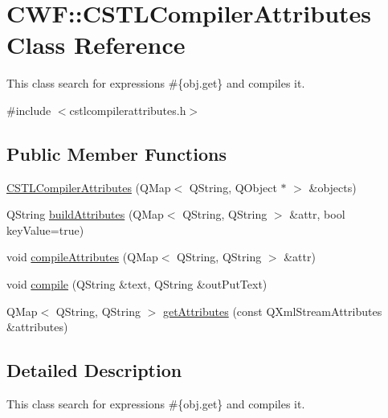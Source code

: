 \hypertarget{class_c_w_f_1_1_c_s_t_l_compiler_attributes}{\section{C\+W\+F\+:\+:C\+S\+T\+L\+Compiler\+Attributes Class Reference}
\label{class_c_w_f_1_1_c_s_t_l_compiler_attributes}
}


This class search for expressions \#\{obj.\+get\} and compiles it.  




{\ttfamily \#include $<$cstlcompilerattributes.\+h$>$}

\subsection*{Public Member Functions}
\begin{DoxyCompactItemize}
\item 
\hyperlink{class_c_w_f_1_1_c_s_t_l_compiler_attributes_a666a7c7dec101d1313027c1037255446}{C\+S\+T\+L\+Compiler\+Attributes} (Q\+Map$<$ Q\+String, Q\+Object $\ast$ $>$ \&objects)
\item 
Q\+String \hyperlink{class_c_w_f_1_1_c_s_t_l_compiler_attributes_a6c09d18bbc92ae092db120385a7d40de}{build\+Attributes} (Q\+Map$<$ Q\+String, Q\+String $>$ \&attr, bool key\+Value=true)
\item 
void \hyperlink{class_c_w_f_1_1_c_s_t_l_compiler_attributes_a5eccb899f04af2c269845f1e86e07813}{compile\+Attributes} (Q\+Map$<$ Q\+String, Q\+String $>$ \&attr)
\item 
void \hyperlink{class_c_w_f_1_1_c_s_t_l_compiler_attributes_a482a81daba4f114b75445ac54868d572}{compile} (Q\+String \&text, Q\+String \&out\+Put\+Text)
\item 
Q\+Map$<$ Q\+String, Q\+String $>$ \hyperlink{class_c_w_f_1_1_c_s_t_l_compiler_attributes_a4cbbe112e36b86ef01401e1b62804d57}{get\+Attributes} (const Q\+Xml\+Stream\+Attributes \&attributes)
\end{DoxyCompactItemize}


\subsection{Detailed Description}
This class search for expressions \#\{obj.\+get\} and compiles it. 

